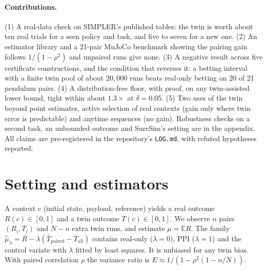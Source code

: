 \documentclass[11pt]{article}
\newcommand{\E}{\mathbb{E}}
\begin{document}
\paragraph{Contributions.} (1) A real-data check on SIMPLER's published tables: the twin is worth about ten real trials for a seen policy and task, and five to seven for a new one. (2) An estimator library and a 21-pair MuJoCo benchmark showing the pairing gain follows $1/(1-\rho^2)$ and unpaired runs give none. (3) A negative result across five certificate constructions, and the condition that reverses it: a betting interval with a finite twin pool of about $20{,}000$ runs beats real-only betting on 20 of 21 pendulum pairs. (4) A distribution-free floor, with proof, on any twin-assisted lower bound, tight within about $1.3\times$ at $\delta=0.05$. (5) Two uses of the twin beyond point estimates, active selection of real contexts (gain only where twin error is predictable) and anytime sequences (no gain). Robustness checks on a second task, an unbounded outcome and SureSim's setting are in the appendix. All claims are pre-registered in the repository's \texttt{LOG.md}, with refuted hypotheses reported.

\section{Setting and estimators}
A context $c$ (initial state, payload, reference) yields a real outcome $R(c)\in[0,1]$ and a twin outcome $T(c)\in[0,1]$. We observe $n$ pairs $(R_i,T_i)$ and $N-n$ extra twin runs, and estimate $\mu=\E R$. The family $\hat\mu_\lambda=\bar R-\lambda(\bar T_{\mathrm{paired}}-\bar T_{\mathrm{all}})$ contains real-only ($\lambda=0$), PPI ($\lambda=1$) and the control variate with $\lambda$ fitted by least squares. It is unbiased for any twin bias. With paired correlation $\rho$ the variance ratio is $E\approx 1/(1-\rho^2(1-n/N))$.
\end{document}

